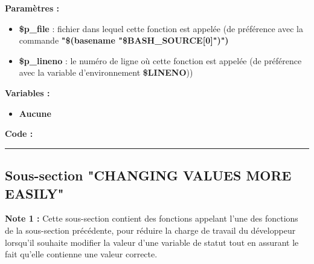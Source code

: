 \documentclass[a4paper,10pt]{article}
\begin{document}
\begin{justify}
    \textbf{Paramètres :}
    \begin{itemize}
        \item \color{orange}\textbf{\$p\_file}\color{white} : fichier dans lequel cette fonction est appelée (de préférence avec la commande \textbf{"\$(\color{gray}basename \color{white}"\color{orange}\$BASH\_SOURCE[0]\color{white}")")}\\

        \item \color{orange}\textbf{\$p\_lineno}\color{white} : le numéro de ligne où cette fonction est appelée (de préférence avec la variable d'environnement \textbf{\color{orange}\$LINENO}))
    \end{itemize}
\end{justify}

\begin{justify}
    \textbf{Variables :}

    \begin{itemize}
        \item \textbf{Aucune}
    \end{itemize}
\end{justify}

\begin{justify}
    \textbf{Code :}
\end{justify}




\color{green}\par\noindent\rule{\textwidth}{0.4pt}\color{white}

\color{green}
\subsection{Sous-section "CHANGING VALUES MORE EASILY"}\color{white}

\begin{justify}
    \textbf{Note 1 :} Cette sous-section contient des fonctions appelant l'une des fonctions de la sous-section précédente, pour réduire la charge de travail du développeur lorsqu'il souhaite modifier la valeur d'une variable de statut tout en assurant le fait qu'elle contienne une valeur correcte.
\end{justify}
\end{document}
